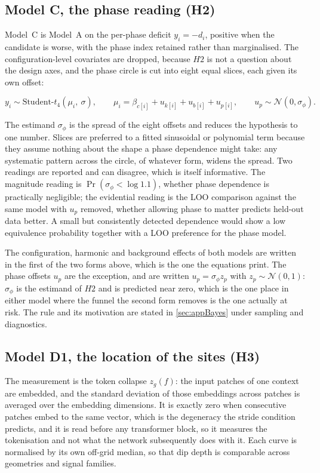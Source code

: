 \subsection{Model C, the phase reading (H2)}

Model~C is Model~A on the per-phase deficit $y_i=-d_i$, positive when the candidate is worse, with the phase index retained rather than marginalised. The configuration-level covariates are dropped, because $H2$ is not a question about the design axes, and the phase circle is cut into eight equal slices, each given its own offset:

\begin{equation*}
y_i \sim \text{Student-}t_4(\mu_i,\ \sigma),
\qquad
\mu_i = \beta_{c[i]} + u_{k[i]} + u_{b[i]} + u_{p[i]},
\qquad
u_p \sim \mathcal{N}(0, \sigma_\phi).
\end{equation*}

The estimand $\sigma_\phi$ is the spread of the eight offsets and reduces the hypothesis to one number. Slices are preferred to a fitted sinusoidal or polynomial term because they assume nothing about the shape a phase dependence might take: any systematic pattern across the circle, of whatever form, widens the spread. Two readings are reported and can disagree, which is itself informative. The magnitude reading is $\Pr(\sigma_\phi<\log 1.1)$, whether phase dependence is practically negligible; the evidential reading is the LOO comparison against the same model with $u_p$ removed, whether allowing phase to matter predicts held-out data better. A small but consistently detected dependence would show a low equivalence probability together with a LOO preference for the phase model.

The configuration, harmonic and background effects of both models are written in the first of the two forms above, which is the one the equations print. The phase offsets $u_p$ are the exception, and are written $u_p=\sigma_\phi z_p$ with $z_p\sim\mathcal N(0,1)$: $\sigma_\phi$ is the estimand of $H2$ and is predicted near zero, which is the one place in either model where the funnel the second form removes is the one actually at risk. The rule and its motivation are stated in \autoref{sec:appBayes} under sampling and diagnostics.

\subsection{Model D1, the location of the sites (H3)}

The measurement is the token collapse $z_g(f)$: the input patches of one context are embedded, and the standard deviation of those embeddings across patches is averaged over the embedding dimensions. It is exactly zero when consecutive patches embed to the same vector, which is the degeneracy the stride condition predicts, and it is read before any transformer block, so it measures the tokenisation and not what the network subsequently does with it. Each curve is normalised by its own off-grid median, so that dip depth is comparable across geometries and signal families.

